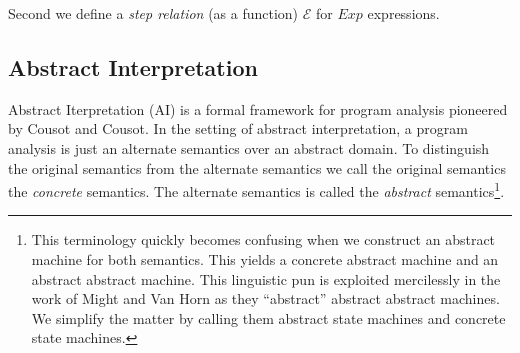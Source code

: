 \documentclass{article}
\begin{document}
Second we define a \emph{step relation} (as a function) $ℰ$ for $Exp$ expressions.



\subsection{Abstract Interpretation}
\label{AI}

Abstract Iterpretation (AI) is a formal framework for program analysis pioneered by Cousot and Cousot\cite{cousot:1977:ai}.
In the setting of abstract interpretation, a program analysis is just an alternate semantics over an abstract domain.
To distinguish the original semantics from the alternate semantics we call the original semantics the \emph{concrete} semantics.
The alternate semantics is called the \emph{abstract} semantics\footnote{
  This terminology quickly becomes confusing when we construct an abstract machine for both semantics.
  This yields a concrete abstract machine and an abstract abstract machine. 
  This linguistic pun is exploited mercilessly in the work of Might and Van Horn as they “abstract” abstract abstract machines.
  We simplify the matter by calling them abstract state machines and concrete state machines.
}.
\end{document}
